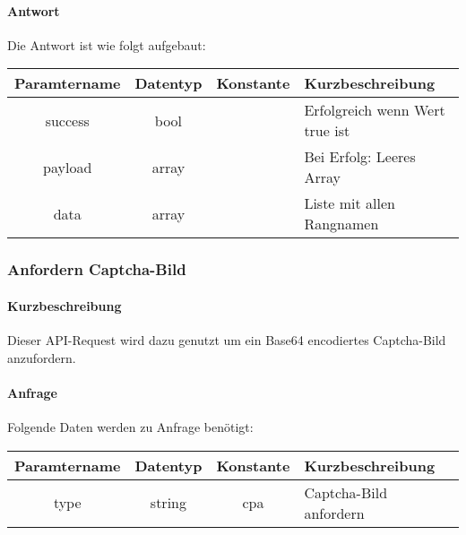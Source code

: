 \paragraph{Antwort}Die Antwort ist wie folgt aufgebaut:
\begin{table}[H]
	\begin{tabular}{|c|c|c|p{6.5cm}|}
		\hline
		\textbf{Paramtername} & \textbf{Datentyp} & \textbf{Konstante} & \textbf{Kurzbeschreibung}            \\ \hline                
		success             & bool             &                 & Erfolgreich wenn Wert {\glqq true\grqq} ist \\ \hline
		payload             & array            &                 & Bei Erfolg: Leeres Array \\ \hline
		data                & array            &                 & Liste mit allen Rangnamen \\ \hline
	\end{tabular}
\end{table}
\subsubsection{Anfordern Captcha-Bild}
\paragraph{Kurzbeschreibung}Dieser API-Request wird dazu genutzt um ein Base64 encodiertes Captcha-Bild anzufordern.
\paragraph{Anfrage}Folgende Daten werden zu Anfrage benötigt:
\begin{table}[H]
	\begin{tabular}{|c|c|c|p{6.5cm}|}
		\hline
		\textbf{Paramtername} & \textbf{Datentyp} & \textbf{Konstante} & \textbf{Kurzbeschreibung}                                                                                               \\ \hline
		type                & string            & cpa                & Captcha-Bild anfordern \\ \hline
	\end{tabular}
\end{table}
